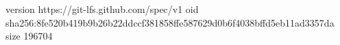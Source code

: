 version https://git-lfs.github.com/spec/v1
oid sha256:8fe520b419b9b26b22ddccf381858ffe587629d0b6f4038bffd5eb11ad3357da
size 196704
